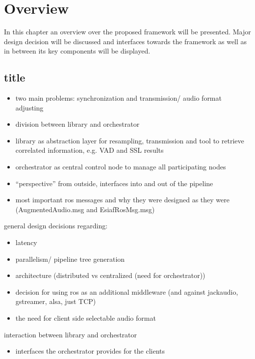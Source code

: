 

\section{Overview}

In this chapter an overview over the proposed framework will be presented. 
Major design decision will be discussed and interfaces towards the framework as well as in between its key components will be displayed.

\subsection{title}

\begin{itemize}
	\item two main problems: synchronization and transmission/ audio format adjusting
	\item division between library and orchestrator
	\item library as abstraction layer for resampling, transmission and tool to retrieve correlated information, e.g. VAD and SSL results
	\item orchestrator as central control node to manage all participating nodes
	\item ``perspective'' from outside, interfaces into and out of the pipeline
	\item most important ros messages and why they were designed as they were (AugmentedAudio.msg and EsiafRosMsg.msg)
\end{itemize}

general design decisions regarding:

\begin{itemize}
	\item latency
	\item parallelism/ pipeline tree generation
	\item architecture (distributed vs centralized (need for orchestrator))
	\item decision for using ros as an additional middleware (and against jackaudio, gstreamer, alsa, just TCP)
	\item the need for client side selectable audio format 
\end{itemize}

interaction between library and orchestrator

\begin{itemize}
	\item interfaces the orchestrator provides for the clients
\end{itemize}